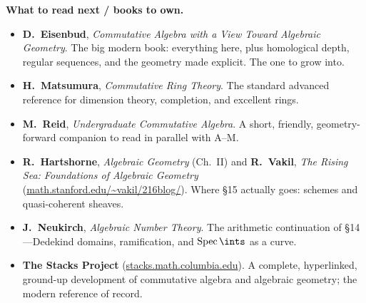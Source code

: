 \documentclass[11pt]{article}
\DeclareMathOperator{\Spec}{Spec}
\begin{document}
\medskip
\noindent\textbf{What to read next / books to own.}
\begin{itemize}\setlength{\itemsep}{3pt}
\item \textbf{D.\ Eisenbud}, \emph{Commutative Algebra with a View Toward Algebraic Geometry}.
The big modern book: everything here, plus homological depth, regular sequences, and the
geometry made explicit. The one to grow into.
\item \textbf{H.\ Matsumura}, \emph{Commutative Ring Theory}. The standard advanced reference
for dimension theory, completion, and excellent rings.
\item \textbf{M.\ Reid}, \emph{Undergraduate Commutative Algebra}. A short, friendly,
geometry-forward companion to read in parallel with A--M.
\item \textbf{R.\ Hartshorne}, \emph{Algebraic Geometry} (Ch.~II) and \textbf{R.\ Vakil},
\emph{The Rising Sea: Foundations of Algebraic Geometry} (\url{math.stanford.edu/~vakil/216blog/}).
Where \S15 actually goes: schemes and quasi-coherent sheaves.
\item \textbf{J.\ Neukirch}, \emph{Algebraic Number Theory}. The arithmetic continuation of
\S14---Dedekind domains, ramification, and $\Spec\ints$ as a curve.
\item \textbf{The Stacks Project} (\url{stacks.math.columbia.edu}). A complete, hyperlinked,
ground-up development of commutative algebra and algebraic geometry; the modern reference of
record.
\end{itemize}
\end{document}
